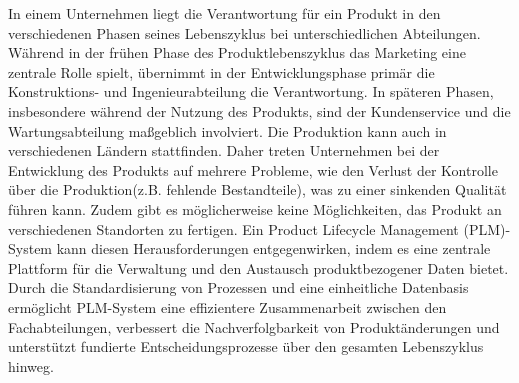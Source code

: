 In einem Unternehmen liegt die Verantwortung für ein Produkt in den verschiedenen Phasen seines Lebenszyklus bei unterschiedlichen Abteilungen. Während in der frühen Phase des Produktlebenszyklus das Marketing eine zentrale Rolle spielt, übernimmt in der Entwicklungsphase primär die Konstruktions- und Ingenieurabteilung die Verantwortung. In späteren Phasen, insbesondere während der Nutzung des Produkts, sind der Kundenservice und die Wartungsabteilung maßgeblich involviert. Die Produktion kann auch in verschiedenen Ländern stattfinden.
Daher treten Unternehmen bei der Entwicklung des Produkts auf mehrere Probleme, wie den Verlust der Kontrolle über die Produktion(z.B. fehlende Bestandteile), was zu einer sinkenden Qualität führen kann. Zudem gibt es möglicherweise keine Möglichkeiten, das Produkt an verschiedenen Standorten zu fertigen\cite{stark2011product}.\newline
Ein Product Lifecycle Management (PLM)-System kann diesen Herausforderungen entgegenwirken, indem es eine zentrale Plattform für die Verwaltung und den Austausch produktbezogener Daten bietet. Durch die Standardisierung von Prozessen und eine einheitliche Datenbasis ermöglicht PLM-System eine effizientere Zusammenarbeit zwischen den Fachabteilungen, verbessert die Nachverfolgbarkeit von Produktänderungen und unterstützt fundierte Entscheidungsprozesse über den gesamten Lebenszyklus hinweg\cite{ozturk2019product}.
